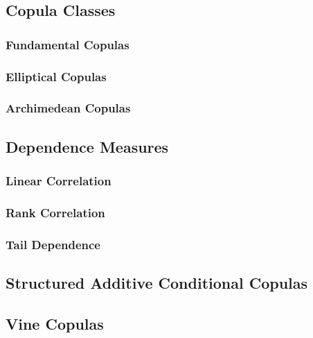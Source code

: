 \documentclass[12pt, twoside]{article}
\numberwithin{equation}{section}
\numberwithin{table}{section}
\numberwithin{figure}{section}
\begin{document}
\subsection{Copula Classes} \label{ssec:copula_classes}

\subsubsection{Fundamental Copulas} \label{sssec:fundamental_copulas}

\subsubsection{Elliptical Copulas} \label{sssec:elliptical_copulas}

\subsubsection{Archimedean Copulas} \label{sssec:archimedean_copulas}

\subsection{Dependence Measures} \label{ssec:dependence_measures}

\subsubsection{Linear Correlation} \label{sssec:linear_correlation}

\subsubsection{Rank Correlation} \label{sssec:rank_correlation}

\subsubsection{Tail Dependence} \label{sssec:tail_dependence}

\subsection{Structured Additive Conditional Copulas} \label{ssec:conditional_copulas}
%
\subsection{Vine Copulas} \label{ssec:vine_copulas}
%
\newpage
\thispagestyle{empty}
\cleardoublepage
\end{document}
